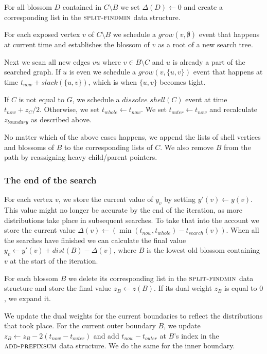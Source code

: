 For all blossom $D$ contained in $C \setminus B$ we set $\Delta(D) \gets 0$ and create a corresponding list in the $\textsc{split-findmin}$ data structure.

For each exposed vertex $v$ of $C \setminus B$ we schedule a $grow(v, \emptyset)$ event that happens at current time and establishes the blossom of $v$ as a root of a new search tree.

Next we scan all new edges $vu$ where $v \in B \setminus C$ and $u$ is already a part of the  searched graph. If $u$ is even we schedule a $grow(v, \{u, v\})$ event that happens at time $t_{now} + slack(\{u, v\})$, which is when $\{u, v\}$ becomes tight. 

If $C$ is not equal to $G$, we schedule a $dissolve\_shell(C)$ event at time $t_{now} + z_C / 2$. Otherwise, we set $t_{whole} \gets t_{now}$. We set $t_{outer} \gets t_{now}$ and recalculate $z_{boundary}$ as described above.

No matter which of the above cases happens, we append the lists of shell vertices and blossoms of $B$ to the corresponding lists of $C$. We also remove $B$ from the path by reassigning heavy child/parent pointers.

\subsubsection*{The end of the search} 
For each vertex $v$, we store the current value of $y_v$ by setting $y'(v) \gets y(v)$. This value might no longer be accurate by the end of the iteration, as more distributions take place in subsequent searches. To take that into the account we store the current value $\Delta(v) \gets (\min(t_{now}, t_{whole}) - t_{search}(v))$. When all the searches have finished we can calculate the final value $y_v \gets y'(v) + dist(B) - \Delta(v)$, where $B$ is the lowest old blossom containing $v$ at the start of the iteration.

For each blossom $B$ we delete its corresponding list in the $\textsc{split-findmin}$ data structure and store the final value $z_B \gets z(B)$. If its dual weight $z_B$ is equal to $0$, we expand it.

We update the dual weights for the current boundaries to reflect the distributions that took place. For the current outer boundary $B$, we update $z_B \gets z_B - 2(t_{now} - t_{outer})$ and add $t_{now} - t_{outer}$ at $B$'s index in the $\textsc{add-prefixsum}$ data structure. We do the same for the inner boundary.

